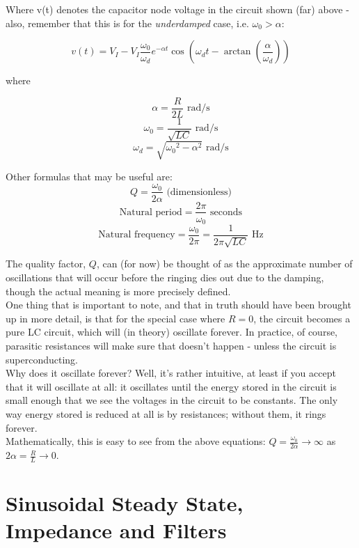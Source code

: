 \documentclass[12pt,a4paper]{report}
\begin{document}
Where v(t) denotes the capacitor node voltage in the circuit shown (far) above - also, remember that this is for the \emph{underdamped} case, i.e. $\displaystyle \omega_0 > \alpha$:

\[ v(t) = V_I - V_I \frac{\omega_0}{\omega_d} e^{-\alpha t} \cos{(\omega_d t - \arctan{(\frac{\alpha}{\omega_d})})} \]

where

\[ \alpha = \frac{R}{2L} \text{ rad/s}\]
\[ \omega_0 = \frac{1}{\sqrt{LC}} \text{ rad/s} \]
\[ \omega_d = \sqrt{{\omega_0}^2 - \alpha^2} \text{ rad/s} \]

Other formulas that may be useful are:
\[ Q = \frac{\omega_0}{2\alpha} \text{ (dimensionless)} \]
\[ \text{Natural period} = \frac{2\pi}{\omega_0} \text{ seconds} \]
\[ \text{Natural frequency} = \frac{\omega_0}{2\pi} = \frac{1}{2\pi \sqrt{LC}} \text{ Hz} \]

The quality factor, $Q$, can (for now) be thought of as the approximate number of oscillations that will occur before the ringing dies out due to the damping, though the actual meaning is more precisely defined.\\

One thing that is important to note, and that in truth should have been brought up in more detail, is that for the special case where $R = 0$, the circuit becomes a pure LC circuit, which will (in theory) oscillate forever. In practice, of course, parasitic resistances will make sure that doesn't happen - unless the circuit is superconducting.\\
Why does it oscillate forever? Well, it's rather intuitive, at least if you accept that it will oscillate at all: it oscillates until the energy stored in the circuit is small enough that we see the voltages in the circuit to be constants. The only way energy stored is reduced at all is by resistances; without them, it rings forever.\\

Mathematically, this is easy to see from the above equations: $\displaystyle Q = \frac{\omega_0}{2\alpha} \to \infty$ as $2\displaystyle \alpha = \frac{R}{L} \to 0$.


\chapter{Sinusoidal Steady State, Impedance and Filters}
\end{document}
